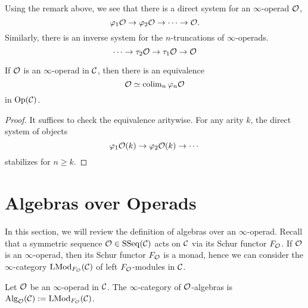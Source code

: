\begin{remark}
	Using the remark above, we see that there is a direct system for an $\infty$-operad ${\mathcal{O}}$, 
\begin{equation}
\varphi_1{\mathcal{O}} \to \varphi_2{\mathcal{O}} \to \cdots \to {\mathcal{O}}.
\end{equation}
Similarly, there is an inverse system for the $n$-truncations of $\infty$-operads.
\begin{equation}
\cdots \to 
\tau_2 {\mathcal{O}}
\to 
\tau_1 {\mathcal{O}}
\to 
{\mathcal{O}}
\end{equation}
\end{remark}



\begin{proposition}
\label{Operad as a colimits}
	If ${\mathcal{O}}$ is an $\infty$-operad in ${\mathcal{C}}$, 
	then there is an equivalence
	\[
	{\mathcal{O}} \simeq
	\operatorname{colim}_n \varphi_n {\mathcal{O}}
	\]
	in $\operatorname{Op}({\mathcal{C}})$.
\end{proposition}
\begin{proof}
    It suffices to check the equivalence aritywise.
    For any arity $k$, the direct system of objects 
    $$
    \varphi_1{\mathcal{O}}(k) \to \varphi_2{\mathcal{O}}(k) \to \cdots    
    $$
    stabilizes for $n \geq k$.
\end{proof}





\section{Algebras over Operads}
\label{Algebras over Operads}
In this section, we will review the definition of algebras over an $\infty$-operad.
Recall that a symmetric sequence ${\mathcal{O}}\in\operatorname{SSeq}({\mathcal{C}})$ acts on ${\mathcal{C}}$ via its Schur functor $F_{{\mathcal{O}}}$.
If ${\mathcal{O}}$ is an $\infty$-operad, then its Schur functor $F_{\mathcal{O}}$ is a monad, hence we can consider the $\infty$-category $\operatorname{LMod}_{F_{\mathcal{O}}}({\mathcal{C}})$ of left $F_{\mathcal{O}}$-modules in ${\mathcal{C}}$.
\begin{definition}
	\label{algebras over an operad}
	Let ${\mathcal{O}}$ be an $\infty$-operad in ${\mathcal{C}}$. The $\infty$-category of ${\mathcal{O}}$-algebras is $\operatorname{Alg}_{{\mathcal{O}}}({\mathcal{C}}):= \operatorname{LMod}_{F_{\mathcal{O}}}({\mathcal{C}})$.
\end{definition}

